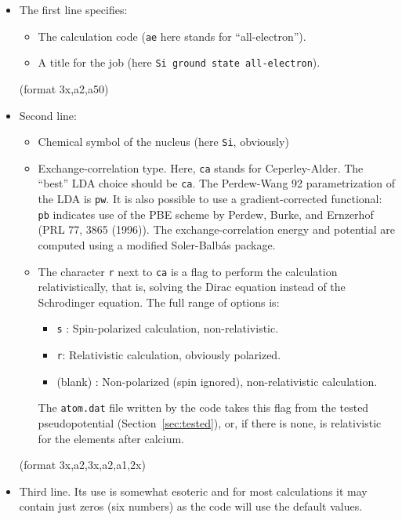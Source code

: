\documentclass[11pt]{article}
\begin{document}
\begin{itemize}
\item The first line specifies:
	\begin{itemize}
	\item The calculation code ({\tt ae} here stands for ``all-electron'').
	\item A title for the job (here {\tt Si ground state all-electron}).
	\end{itemize}

	(format 3x,a2,a50)

\item Second line:
	\begin{itemize}

	\item Chemical symbol of the nucleus (here {\tt Si}, obviously)
	\item Exchange-correlation type. Here, {\tt ca} stands for
          Ceperley-Alder.  The
          ``best'' LDA choice should be {\tt ca}.  The Perdew-Wang 92
          parametrization of the LDA is {\tt pw}.  It is also possible
          to use a gradient-corrected functional: {\tt pb} indicates use
          of the PBE scheme by Perdew, Burke, and Ernzerhof (PRL 77,
          3865 (1996)).
	  The exchange-correlation energy and potential
	  are computed using a modified Soler-Balb\'as package.

	\item The character {\tt r} next to {\tt ca} is a flag to perform the
          calculation relativistically, that is, solving the Dirac equation
          instead of the Schrodinger equation.
	  The full range of options is:
	    \begin{itemize}
		\item {\tt s} : Spin-polarized calculation, non-relativistic.
		\item {\tt r}: Relativistic calculation, obviously polarized.
		\item (blank) : Non-polarized (spin ignored), non-relativistic
           		calculation.
	    \end{itemize}
	  The \texttt{atom.dat} file written by the code takes this flag from the
	  tested pseudopotential (Section~\ref{sec:tested}), or, if there is none,
	  is relativistic for the elements after calcium.
	\end{itemize}

	(format 3x,a2,3x,a2,a1,2x)

\item Third line. Its use is somewhat esoteric and for most
calculations it may contain just zeros (six numbers) as the code
will use the default values.


\end{itemize}
\end{document}

